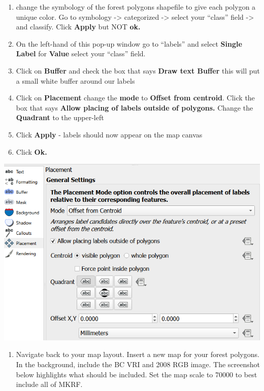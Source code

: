 \documentclass[
  letterpaper,
]{book}
\providecommand{\tightlist}{%
  \setlength{\itemsep}{0pt}\setlength{\parskip}{0pt}}\usepackage{longtable,booktabs,array}
\begin{document}
\begin{enumerate}
\def\labelenumi{\Alph{enumi}.}
\tightlist
\item
  change the symbology of the forest polygons shapefile to give each
  polygon a unique color. Go to symbology -\textgreater{} categorized
  -\textgreater{} select your ``class'' field -\textgreater{} and
  classify. Click \textbf{Apply} but NOT \textbf{ok.}
\item
  On the left-hand of this pop-up window go to ``labels'' and select
  \textbf{Single Label} for \textbf{Value} select your ``class'' field.
\item
  Click on \textbf{Buffer} and check the box that says \textbf{Draw text
  Buffer} this will put a small white buffer around our labels
\item
  Click on \textbf{Placement} change the \textbf{mode} to \textbf{Offset
  from centroid}. Click the box that says \textbf{Allow placing of
  labels outside of polygons.} Change the \textbf{Quadrant} to the
  upper-left
\item
  Click \textbf{Apply} - labels should now appear on the map canvas
\item
  Click \textbf{Ok.}
\end{enumerate}

\includegraphics{images/clipboard-74741472.png}

\begin{enumerate}
\def\labelenumi{\Alph{enumi}.}
\setcounter{enumi}{6}
\tightlist
\item
  Navigate back to your map layout. Insert a new map for your forest
  polygons. In the background, include the BC VRI and 2008 RGB image.
  The screenshot below highlights what should be included. Set the map
  scale to 70000 to best include all of MKRF.
\end{enumerate}
\end{document}

